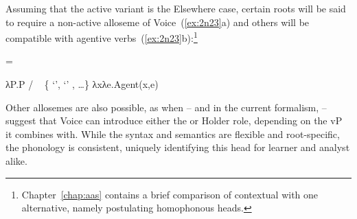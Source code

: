 \begin{exe}
\begin{xlist}
\begin{exe}
\begin{xlist}
\begin{exe}
\begin{xlist}
\begin{exe}
\begin{exe}
\begin{xlist}
\begin{exe}
\begin{xlist}
\begin{exe}
\begin{xlist}
\begin{exe}
\begin{xlist}
\begin{exe}
\begin{xlist}
\begin{exe}
\begin{xlist}
\begin{exe}
\begin{xlist}
\begin{exe}
\begin{xlist}
\begin{exe}
\begin{xlist}
\begin{exe}
\begin{xlist}
\begin{exe}
\begin{xlist}
\begin{exe}
\begin{xlist}
\begin{exe}
\begin{exe}
\begin{xlist}
\begin{exe}
\begin{xlist}
\begin{exe}
\begin{xlist}
\begin{exe}
\begin{xlist}
{Assuming that the active variant is the Elsewhere case, certain roots will be said to require a non-active alloseme of Voice~(\ref{ex:2n23}a) and others will be compatible with agentive verbs~(\ref{ex:2n23}b):\footnote{Chapter~\ref{chap:aas} contains a brief comparison of contextual  with one alternative, namely postulating homophonous heads.}
 \begin{exe}
 \ex  \label{ex:2n23} =  
 \begin{xlist} 
 	\ex  λP.P \phantom{agent(x,e)xxx} / \trace~ \{  `',  `' , \dots \} 
 	\ex  λxλe.Agent(x,e) 
 \z
\z 

Other allosemes are also possible, as when \cite{kratzer96} -- and in the current formalism, \cite{woodmarantz17} -- suggest that Voice can introduce either the  or Holder role, depending on the vP it combines with. While the syntax and semantics are flexible and root-specific, the phonology is consistent, uniquely identifying this head for learner and analyst alike.
		

\end{xlist}
\end{exe}}
\end{xlist}
\end{exe}
\end{xlist}
\end{exe}
\end{xlist}
\end{exe}
\end{xlist}
\end{exe}
\end{exe}
\end{xlist}
\end{exe}
\end{xlist}
\end{exe}
\end{xlist}
\end{exe}
\end{xlist}
\end{exe}
\end{xlist}
\end{exe}
\end{xlist}
\end{exe}
\end{xlist}
\end{exe}
\end{xlist}
\end{exe}
\end{xlist}
\end{exe}
\end{xlist}
\end{exe}
\end{xlist}
\end{exe}
\end{xlist}
\end{exe}
\end{exe}
\end{xlist}
\end{exe}
\end{xlist}
\end{exe}
\end{xlist}
\end{exe}

